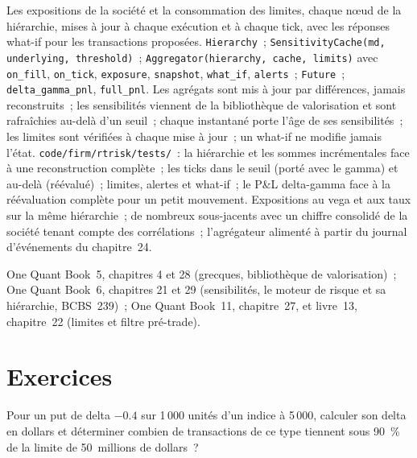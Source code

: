 \begin{build}
 Les expositions de la société et la consommation des limites, chaque nœud de la hiérarchie, mises à jour à chaque exécution et à chaque tick, avec les réponses what-if pour
les transactions proposées.
 \texttt{Hierarchy}~; \texttt{SensitivityCache(md, underlying, threshold)}~;
\texttt{Aggregator(hierarchy, cache, limits)} avec \texttt{on\_fill}, \texttt{on\_tick}, \texttt{exposure}, \texttt{snapshot}, \texttt{what\_if}, \texttt{alerts}~;
\texttt{Future}~; \texttt{delta\_gamma\_pnl}, \texttt{full\_pnl}.
 Les agrégats sont mis à jour par différences, jamais reconstruits~; les sensibilités viennent de la bibliothèque de valorisation et sont rafraîchies au-delà
d'un seuil~; chaque instantané porte l'âge de ses sensibilités~; les limites sont vérifiées à chaque mise à jour~; un what-if ne modifie jamais l'état.
 \texttt{code/firm/rtrisk/tests/}~: la hiérarchie et les sommes incrémentales face à une reconstruction complète~; les ticks dans le
seuil (porté avec le gamma) et au-delà (réévalué)~; limites, alertes et what-if~; le P\&L delta-gamma face à la réévaluation complète pour un petit
mouvement.
 Expositions au vega et aux taux sur la même hiérarchie~; de nombreux sous-jacents avec un chiffre consolidé de la société tenant compte des corrélations~; l'agrégateur alimenté
à partir du journal d'événements du chapitre~24.
\end{build}

\begin{omsources}
\item One Quant Book~5, chapitres 4 et 28 (grecques, bibliothèque de valorisation)~; One Quant Book~6, chapitres 21 et 29 (sensibilités, le moteur de
risque et sa hiérarchie, BCBS~239)~; One Quant Book~11, chapitre~27, et livre~13, chapitre~22 (limites et filtre pré-trade).
\end{omsources}

\section{Exercices}

\begin{exercise}[$\star$]\label{exo:pl:real-time-risk:1}
Pour un put de delta $-0.4$ sur 1\,000 unités d'un indice à 5\,000, calculer son delta en dollars et déterminer combien de transactions de ce type tiennent sous 90~\% de la
limite de 50~millions de dollars~?
\end{exercise}

